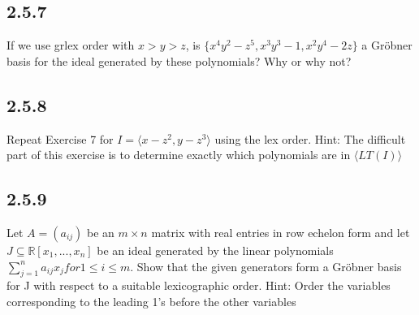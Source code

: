 \documentclass[]{article}
\newcommand\<{\langle}
\renewcommand\>{\rangle}
\newcommand{\RR}{\ensuremath{\mathbb{R}}}
\begin{document}
\subsection*{2.5.7} If we use grlex order with $x > y > z$, is $\{x^4y^2-z^5,x^3y^3-1,x^2y^4-2z\}$ a Gröbner basis for the ideal generated by these polynomials? Why or why not?

\subsection*{2.5.8} Repeat Exercise 7 for $I = \<x - z^2, y - z^3\>$ using the lex order. Hint: The difficult part of this exercise is to determine exactly which polynomials are in $\<LT(I)\>$

\subsection*{2.5.9} Let $A = (a_{ij})$ be an $m \times n$ matrix with real entries in row echelon form and let $J \subseteq \RR[x_1 , . . . , x_n ]$ be an ideal generated by the linear polynomials $\sum_{j=1}^{n}  a_{ij} x_j for 1 \leq i \leq m$.
Show that the given generators form a Gröbner basis for J with respect to a suitable
lexicographic order. Hint: Order the variables corresponding to the leading 1’s before
the other variables
\end{document}
